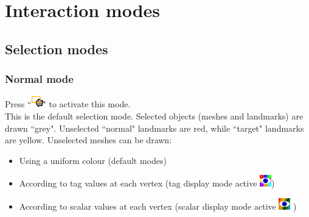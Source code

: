 \chapter{Interaction modes}
\minitoc  

 \section{Selection modes}
 \subsection{Normal mode}
Press ``\includegraphics{images/pixmap/Normal_select_mode.png}" to activate this mode.\\
This is the default selection mode. Selected objects (meshes and landmarks) are drawn ``grey". Unselected ``normal" landmarks are red, while ``target" landmarks are yellow. Unselected meshes can be drawn:
\begin{itemize}
\item Using a uniform colour (default modes)
\item According to tag values at each vertex (tag display mode active \includegraphics{images/pixmap/Show_Tag_Window.png})
\item	According to scalar values at each vertex (scalar display mode active \includegraphics{images/pixmap/show_color_scale.png} )
\end{itemize}



